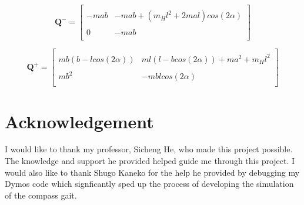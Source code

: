 \documentclass{./springer/svjour3}
\newcommand{\mb}[1]{\mathbf{#1}}
\begin{document}
\begin{equation}
\mb{Q^-} = 
\label{eq:Q-}
\begin{bmatrix}
\\-mab & -mab + (m_Hl^2+2mal)cos(2\alpha)\\
\\0 & -mab\\
\end{bmatrix}
\end{equation}

\begin{equation}
\mb{Q^+} = 
\label{eq:Q+}
\begin{bmatrix}
\\mb(b-lcos(2\alpha)) & ml(l-bcos(2\alpha)) + ma^2 + m_Hl^2\\
\\mb^2 & -mblcos(2\alpha)\\
\end{bmatrix}
\end{equation}


\section*{Acknowledgement}
\LARGE
I would like to thank my professor, Sicheng He, who made this project possible. The knowledge and support he provided 
helped guide me through this project. I would also like to thank Shugo Kaneko for the help he provided by debugging my Dymos code which 
signficantly sped up the process of developing the simulation of the compass gait.

\clearpage

\pagestyle{plain}
\normalsize

\end{document}
